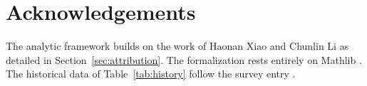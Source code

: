 \documentclass[11pt,a4paper]{article}
\theoremstyle{definition}
\begin{document}
\section*{Acknowledgements}

The analytic framework builds on the work of Haonan Xiao and Chunlin Li
\cite{XiaoLi2026} as detailed in Section~\ref{sec:attribution}. The
formalization rests entirely on Mathlib \cite{Mathlib}. The historical data of
Table~\ref{tab:history} follow the survey entry \cite{Tao2026}.



\end{document}
